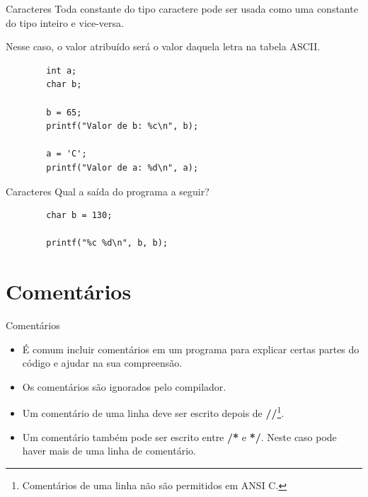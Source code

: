 \documentclass[handout]{beamer}
\begin{document}
\begin{frame}[fragile]{Caracteres}
    Toda constante do tipo caractere pode ser usada como uma constante do tipo inteiro e vice-versa.
    
    Nesse caso, o valor atribuído será o valor daquela letra na tabela ASCII.

    \begin{verbatim}
        int a;
        char b;

        b = 65;
        printf("Valor de b: %c\n", b);

        a = 'C';
        printf("Valor de a: %d\n", a);
    \end{verbatim}
\end{frame}

\begin{frame}[fragile]{Caracteres}
    Qual a saída do programa a seguir?
    \begin{verbatim}
        char b = 130;

        printf("%c %d\n", b, b);
    \end{verbatim}
\end{frame}



\section{Comentários}

\begin{frame}[fragile]{Comentários}
    \begin{itemize}
        \item É comum incluir comentários em um programa para explicar certas partes do código e ajudar na sua compreensão.
        \item Os comentários são ignorados pelo compilador.
        \item Um comentário de uma linha deve ser escrito depois de {\bf //}\footnote{Comentários de uma linha não são permitidos em ANSI C.}.
        \item Um comentário também pode ser escrito entre \textbf{/*} e \textbf{*/}. Neste caso pode haver mais de uma linha de comentário.
  \end{itemize}
\end{frame}
\end{document}
